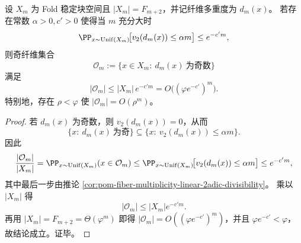 \begin{theorem}\label{thm:xi-fold-odd-fiber-exponential-upper-bound-from-v2}
设 \(X_m\) 为 Fold 稳定块空间且 \(|X_m|=F_{m+2}\)，并记纤维多重度为 \(d_m(x)\)。
若存在常数 \(\alpha>0,c'>0\) 使得当 \(m\) 充分大时
\[
\PP_{x\sim\mathrm{Unif}(X_m)}\!\bigl[v_2(d_m(x))\le \alpha m\bigr]\le e^{-c'm},
\]
则奇纤维集合
\[
\mathcal O_m:=\{x\in X_m:\ d_m(x)\ \text{为奇数}\}
\]
满足
\[
|\mathcal O_m|
\le |X_m|\,e^{-c'm}
=O\!\bigl((\varphi e^{-c'})^m\bigr).
\]
特别地，存在 \(\rho<\varphi\) 使 \(|\mathcal O_m|=O(\rho^m)\)。
\end{theorem}
\begin{proof}
若 \(d_m(x)\) 为奇数，则 \(v_2(d_m(x))=0\)，从而
\[
\{x:\ d_m(x)\ \text{为奇}\}\subseteq \{x:\ v_2(d_m(x))\le \alpha m\}.
\]
因此
\[
\frac{|\mathcal O_m|}{|X_m|}
=\PP_{x\sim\mathrm{Unif}(X_m)}(x\in\mathcal O_m)
\le
\PP_{x\sim\mathrm{Unif}(X_m)}\!\bigl[v_2(d_m(x))\le \alpha m\bigr]
\le e^{-c'm},
\]
其中最后一步由推论 \ref{cor:pom-fiber-multiplicity-linear-2adic-divisibility}。
乘以 \(|X_m|\) 得
\[
|\mathcal O_m|\le |X_m|e^{-c'm}.
\]
再用 \(|X_m|=F_{m+2}=\Theta(\varphi^m)\) 即得
\(
|\mathcal O_m|=O((\varphi e^{-c'})^m)
\)，并且 \(\varphi e^{-c'}<\varphi\)，故结论成立。证毕。
\end{proof}

